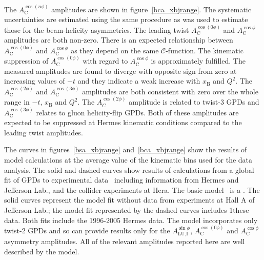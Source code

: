 The $A_{\textrm{C}}^{\cos(n\phi)}$ amplitudes are shown in figure~\ref{bca_xbjrange}. The systematic uncertainties are estimated using the same procedure as was used to estimate those for the beam-helicity asymmetries. The leading twist $A_{\textrm{C}}^{\cos(0\phi)}$ and $A_{\textrm{C}}^{\cos\phi}$ amplitudes are both non-zero. There is an expected relationship between $A_{\textrm{C}}^{\cos(0\phi)}$ and $A_{\textrm{C}}^{\cos\phi}$ as they depend on the same $\mathcal{C}$-function. The kinematic suppression of $A_{\textrm{C}}^{\cos(0\phi)}$ with regard to $A_{\textrm{C}}^{\cos\phi}$ is approximately fulfilled. The measured amplitudes are found to diverge with opposite sign from zero at increasing values of $-t$ and they indicate a weak increase with $x_{\textrm{B}}$ and $Q^{2}$. The $A_{\textrm{C}}^{\cos(2\phi)}$ and $A_{\textrm{C}}^{\cos(3\phi)}$ amplitudes are both consistent with zero over the whole range in $-t$, $x_{\textrm{B}}$ and $Q^{2}$. The $A_{C}^{\cos(2\phi)}$ amplitude is related to twist-3 GPDs and $A_{\textrm{C}}^{\cos(3\phi)}$ relates to gluon helicity-flip GPDs. Both of these amplitudes are expected to be suppressed at H{\sc ermes} kinematic conditions compared to the leading twist amplitudes. 

The curves in  figures~\ref{bsa_xbjrange} and~\ref{bca_xbjrange} show the results of model calculations at the average value of the kinematic bins used for the data analysis. The solid and dashed curves show results of calculations from a global fit of GPDs to experimental data~\cite{Kum09} including information from H{\sc ermes} and Jefferson Lab., and the collider experiments at H{\sc era}. The basic model~\cite{Mue05,Kum07,Kum08} is a . The solid curves represent the model fit without data from experiments \cite{Cam06} at Hall A of Jefferson Lab.; the model fit represented by the dashed curves includes 1these data. Both fits include the 1996-2005 H{\sc ermes} data. The model incorporates only twist-2 GPDs and so can provide results only for the $A_{\textrm{LU,I}}^{\sin\phi}$, $A_{\textrm{C}}^{\cos(0\phi)}$ and $A_{\textrm{C}}^{\cos\phi}$ asymmetry amplitudes. All of the relevant amplitudes reported here are well described by the model.

